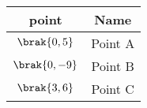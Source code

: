 \begin{tabular}[12pt]{ |c| c|}
    \hline
    \textbf{point} & \textbf{Name}\\ 
    \hline
	$\brak{0,5}$ & Point A \\
    \hline 
	$\brak{0,-9}$ & Point B\\
    \hline
	$\brak{3,6}$ & Point C\\
    \hline
    \end{tabular}